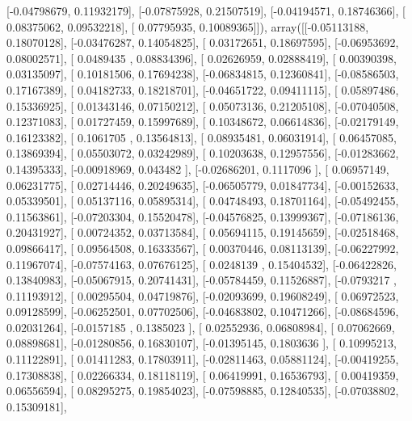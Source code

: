 \documentclass{article}
\begin{document}
       [-0.04798679,  0.11932179],
       [-0.07875928,  0.21507519],
       [-0.04194571,  0.18746366],
       [ 0.08375062,  0.09532218],
       [ 0.07795935,  0.10089365]]), array([[-0.05113188,  0.18070128],
       [-0.03476287,  0.14054825],
       [ 0.03172651,  0.18697595],
       [-0.06953692,  0.08002571],
       [ 0.0489435 ,  0.08834396],
       [ 0.02626959,  0.02888419],
       [ 0.00390398,  0.03135097],
       [ 0.10181506,  0.17694238],
       [-0.06834815,  0.12360841],
       [-0.08586503,  0.17167389],
       [ 0.04182733,  0.18218701],
       [-0.04651722,  0.09411115],
       [ 0.05897486,  0.15336925],
       [ 0.01343146,  0.07150212],
       [ 0.05073136,  0.21205108],
       [-0.07040508,  0.12371083],
       [ 0.01727459,  0.15997689],
       [ 0.10348672,  0.06614836],
       [-0.02179149,  0.16123382],
       [ 0.1061705 ,  0.13564813],
       [ 0.08935481,  0.06031914],
       [ 0.06457085,  0.13869394],
       [ 0.05503072,  0.03242989],
       [ 0.10203638,  0.12957556],
       [-0.01283662,  0.14395333],
       [-0.00918969,  0.043482  ],
       [-0.02686201,  0.1117096 ],
       [ 0.06957149,  0.06231775],
       [ 0.02714446,  0.20249635],
       [-0.06505779,  0.01847734],
       [-0.00152633,  0.05339501],
       [ 0.05137116,  0.05895314],
       [ 0.04748493,  0.18701164],
       [-0.05492455,  0.11563861],
       [-0.07203304,  0.15520478],
       [-0.04576825,  0.13999367],
       [-0.07186136,  0.20431927],
       [ 0.00724352,  0.03713584],
       [ 0.05694115,  0.19145659],
       [-0.02518468,  0.09866417],
       [ 0.09564508,  0.16333567],
       [ 0.00370446,  0.08113139],
       [-0.06227992,  0.11967074],
       [-0.07574163,  0.07676125],
       [ 0.0248139 ,  0.15404532],
       [-0.06422826,  0.13840983],
       [-0.05067915,  0.20741431],
       [-0.05784459,  0.11526887],
       [-0.0793217 ,  0.11193912],
       [ 0.00295504,  0.04719876],
       [-0.02093699,  0.19608249],
       [ 0.06972523,  0.09128599],
       [-0.06252501,  0.07702506],
       [-0.04683802,  0.10471266],
       [-0.08684596,  0.02031264],
       [-0.0157185 ,  0.1385023 ],
       [ 0.02552936,  0.06808984],
       [ 0.07062669,  0.08898681],
       [-0.01280856,  0.16830107],
       [-0.01395145,  0.1803636 ],
       [ 0.10995213,  0.11122891],
       [ 0.01411283,  0.17803911],
       [-0.02811463,  0.05881124],
       [-0.00419255,  0.17308838],
       [ 0.02266334,  0.18118119],
       [ 0.06419991,  0.16536793],
       [ 0.00419359,  0.06556594],
       [ 0.08295275,  0.19854023],
       [-0.07598885,  0.12840535],
       [-0.07038802,  0.15309181],
\end{document}
